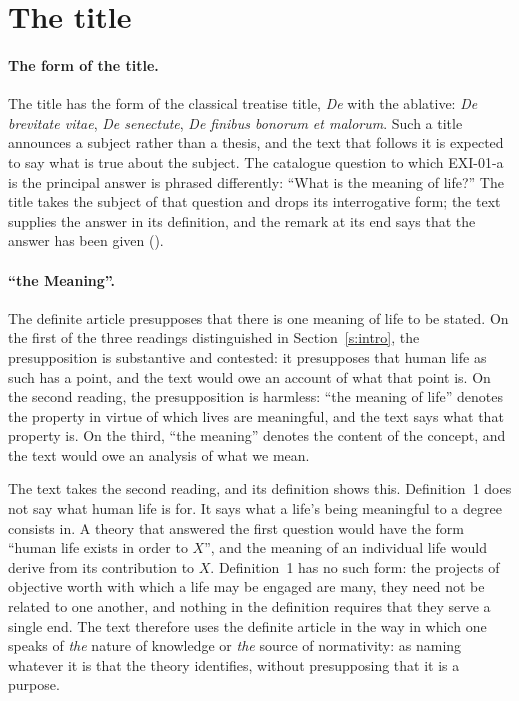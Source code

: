 \section{The title}\label{s:title}


\paragraph{The form of the title.} The title has the form of the classical treatise title, \emph{De} with the ablative: \emph{De brevitate vitae}, \emph{De senectute}, \emph{De finibus bonorum et malorum}. Such a title announces a subject rather than a thesis, and the text that follows it is expected to say what is true about the subject. The catalogue question to which EXI-01-a is the principal answer is phrased differently: \enquote{What is the meaning of life?} The title takes the subject of that question and drops its interrogative form; the text supplies the answer in its definition, and the remark at its end says that the answer has been given ().

\paragraph{\enquote{the Meaning}.} The definite article presupposes that there is one meaning of life to be stated. On the first of the three readings distinguished in Section~\ref{s:intro}, the presupposition is substantive and contested: it presupposes that human life as such has a point, and the text would owe an account of what that point is. On the second reading, the presupposition is harmless: \enquote{the meaning of life} denotes the property in virtue of which lives are meaningful, and the text says what that property is. On the third, \enquote{the meaning} denotes the content of the concept, and the text would owe an analysis of what we mean.

The text takes the second reading, and its definition shows this. Definition~1 does not say what human life is for. It says what a life's being meaningful to a degree consists in. A theory that answered the first question would have the form \enquote{human life exists in order to $X$}, and the meaning of an individual life would derive from its contribution to $X$. Definition~1 has no such form: the projects of objective worth with which a life may be engaged are many, they need not be related to one another, and nothing in the definition requires that they serve a single end. The text therefore uses the definite article in the way in which one speaks of \emph{the} nature of knowledge or \emph{the} source of normativity: as naming whatever it is that the theory identifies, without presupposing that it is a purpose.

